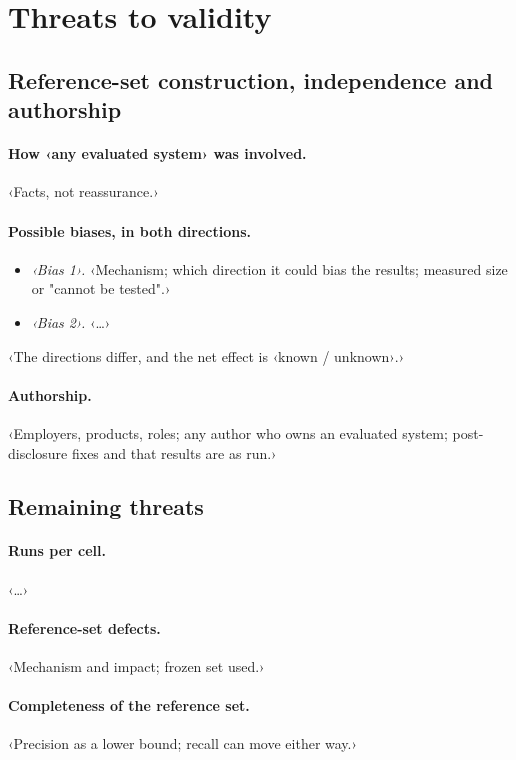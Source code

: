 \section{Threats to validity}
\label{sec:threats}

\subsection{Reference-set construction, independence and authorship}
\label{sec:threats-gt}
\paragraph{How ‹any evaluated system› was involved.} ‹Facts, not reassurance.›
\paragraph{Possible biases, in both directions.}
\begin{itemize}
  \item \emph{‹Bias 1›.} ‹Mechanism; which direction it could bias the results; measured size or "cannot be tested".›
  \item \emph{‹Bias 2›.} ‹…›
\end{itemize}
‹The directions differ, and the net effect is ‹known / unknown›.›
\paragraph{Authorship.} ‹Employers, products, roles; any author who owns an evaluated system; post-disclosure fixes and that results are as run.›

\subsection{Remaining threats}
\label{sec:threats-other}
\paragraph{Runs per cell.} ‹…›
\paragraph{Reference-set defects.} ‹Mechanism and impact; frozen set used.›
\paragraph{Completeness of the reference set.} ‹Precision as a lower bound; recall can move either way.›
